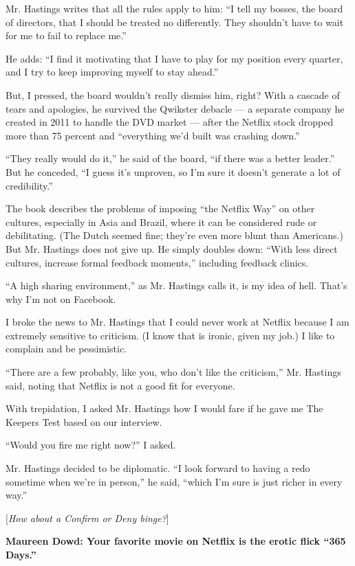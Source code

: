 Mr. Hastings writes that all the rules apply to him: ``I tell my bosses,
the board of directors, that I should be treated no differently. They
shouldn't have to wait for me to fail to replace me.''

He adds: ``I find it motivating that I have to play for my position
every quarter, and I try to keep improving myself to stay ahead.''

But, I pressed, the board wouldn't really dismiss him, right? With a
cascade of tears and apologies, he survived the Qwikster debacle --- a
separate company he created in 2011 to handle the DVD market --- after
the Netflix stock dropped more than 75 percent and ``everything we'd
built was crashing down.''

``They really would do it,'' he said of the board, ``if there was a
better leader.'' But he conceded, ``I guess it's unproven, so I'm sure
it doesn't generate a lot of credibility.''

The book describes the problems of imposing ``the Netflix Way'' on other
cultures, especially in Asia and Brazil, where it can be considered rude
or debilitating. (The Dutch seemed fine; they're even more blunt than
Americans.) But Mr. Hastings does not give up. He simply doubles down:
``With less direct cultures, increase formal feedback moments,''
including feedback clinics.

``A high sharing environment,'' as Mr. Hastings calls it, is my idea of
hell. That's why I'm not on Facebook.

I broke the news to Mr. Hastings that I could never work at Netflix
because I am extremely sensitive to criticism. (I know that is ironic,
given my job.) I like to complain and be pessimistic.

``There are a few probably, like you, who don't like the criticism,''
Mr. Hastings said, noting that Netflix is not a good fit for everyone.

With trepidation, I asked Mr. Hastings how I would fare if he gave me
The Keepers Test based on our interview.

``Would you fire me right now?'' I asked.

Mr. Hastings decided to be diplomatic. ``I look forward to having a redo
sometime when we're in person,'' he said, ``which I'm sure is just
richer in every way.''

{[}\emph{How about a Confirm or Deny binge?}{]}

\textbf{Maureen Dowd: Your favorite movie on Netflix is the erotic flick
``365 Days.''}

